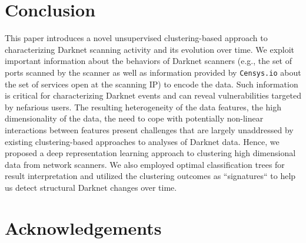\documentclass[manuscript, nonacm]{acmart}
\begin{document}



\section{Conclusion}
\label{sec:conclusion}

This paper introduces a novel unsupervised 
clustering-based approach to characterizing Darknet scanning activity
and its evolution over time.
We exploit important information about the behaviors of Darknet scanners 
(e.g., the set of ports scanned by the scanner as well as information provided
by \texttt{Censys.io} about the set
of services open at the scanning IP) to encode the data. 
Such information is critical for characterizing 
Darknet events and can reveal vulnerabilities targeted by nefarious users. 
The resulting heterogeneity of the data features, the high dimensionality 
of the data, the need to cope with potentially non-linear 
interactions between features present challenges that are largely 
unaddressed by 
existing clustering-based approaches to analyses of Darknet data. 
Hence, we proposed a deep representation learning approach to 
clustering high dimensional data from network scanners. We
also employed optimal classification trees for result interpretation
and utilized the clustering outcomes as ``signatures`` to help
us detect structural Darknet changes over time.


\section*{Acknowledgements}
\end{document}
